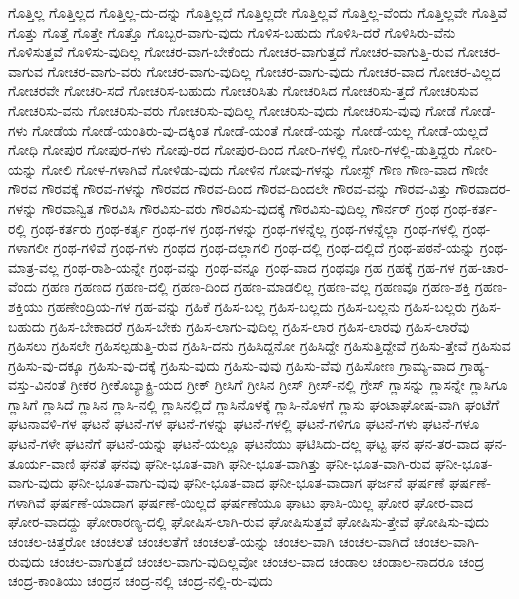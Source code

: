 {ಗೊತ್ತಿಲ್ಲ
ಗೊತ್ತಿಲ್ಲದ
ಗೊತ್ತಿಲ್ಲ-ದು-ದನ್ನು
ಗೊತ್ತಿಲ್ಲದೆ
ಗೊತ್ತಿಲ್ಲದೇ
ಗೊತ್ತಿಲ್ಲವೆ
ಗೊತ್ತಿಲ್ಲ-ವೆಂದು
ಗೊತ್ತಿಲ್ಲವೇ
ಗೊತ್ತಿವೆ
ಗೊತ್ತು
ಗೊತ್ತೆ
ಗೊತ್ತೇ
ಗೊತ್ತೊ
ಗೊಬ್ಬರ-ವಾಗು-ವುದು
ಗೊಳಿಸ-ಬಹುದು
ಗೊಳಿಸಿ-ದರೆ
ಗೊಳಿಸಿರು-ವೆನು
ಗೊಳಿಸುತ್ತವೆ
ಗೊಳಿಸು-ವುದಿಲ್ಲ
ಗೋಚರ-ವಾಗ-ಬೇಕೆಂದು
ಗೋಚರ-ವಾಗುತ್ತದೆ
ಗೋಚರ-ವಾಗುತ್ತಿ-ರುವ
ಗೋಚರ-ವಾಗುವ
ಗೋಚರ-ವಾಗು-ವರು
ಗೋಚರ-ವಾಗು-ವುದಿಲ್ಲ
ಗೋಚರ-ವಾಗು-ವುದು
ಗೋಚರ-ವಾದ
ಗೋಚರ-ವಿಲ್ಲದ
ಗೋಚರವೇ
ಗೋಚರಿ-ಸದೆ
ಗೋಚರಿಸ-ಬಹುದು
ಗೋಚರಿಸಿತು
ಗೋಚರಿಸಿದ
ಗೋಚರಿಸು-ತ್ತದೆ
ಗೋಚರಿಸುವ
ಗೋಚರಿಸು-ವನು
ಗೋಚರಿಸು-ವರು
ಗೋಚರಿಸು-ವುದಿಲ್ಲ
ಗೋಚರಿಸು-ವುದು
ಗೋಚರಿಸು-ವುವು
ಗೋಡೆ
ಗೋಡೆ-ಗಳು
ಗೋಡೆಯ
ಗೋಡೆ-ಯಂತಿರು-ವು-ದಕ್ಕಿಂತ
ಗೋಡೆ-ಯಂತೆ
ಗೋಡೆ-ಯನ್ನು
ಗೋಡೆ-ಯಲ್ಲ
ಗೋಡೆ-ಯಲ್ಲದೆ
ಗೋಧಿ
ಗೋಪುರ
ಗೋಪುರ-ಗಳು
ಗೋಪು-ರದ
ಗೋಪುರ-ದಿಂದ
ಗೋರಿ-ಗಳಲ್ಲಿ
ಗೋರಿ-ಗಳಲ್ಲಿ-ಡುತ್ತಿದ್ದರು
ಗೋರಿ-ಯನ್ನು
ಗೋಲಿ
ಗೋಳ-ಗಳಾಗಿವೆ
ಗೋಳಿಡು-ವುದು
ಗೋಳಿನ
ಗೋವು-ಗಳನ್ನು
ಗೋಸ್ಟ್
ಗೌಣ
ಗೌಣ-ವಾದ
ಗೌಣೀ
ಗೌರವ
ಗೌರವಕ್ಕೆ
ಗೌರವ-ಗಳನ್ನು
ಗೌರವದ
ಗೌರವ-ದಿಂದ
ಗೌರವ-ದಿಂದಲೇ
ಗೌರವ-ವನ್ನು
ಗೌರವ-ವಿತ್ತು
ಗೌರವಾದರ-ಗಳನ್ನು
ಗೌರವಾನ್ವಿತ
ಗೌರವಿಸಿ
ಗೌರವಿಸು-ವರು
ಗೌರವಿಸು-ವುದಕ್ಕೆ
ಗೌರವಿಸು-ವುದಿಲ್ಲ
ಗೌರ್ನರ್
ಗ್ರಂಥ
ಗ್ರಂಥ-ಕರ್ತ-ರಲ್ಲಿ
ಗ್ರಂಥ-ಕರ್ತರು
ಗ್ರಂಥ-ಕರ್ತೃ
ಗ್ರಂಥ-ಗಳ
ಗ್ರಂಥ-ಗಳನ್ನು
ಗ್ರಂಥ-ಗಳನ್ನೆಲ್ಲ
ಗ್ರಂಥ-ಗಳನ್ನೆಲ್ಲಾ
ಗ್ರಂಥ-ಗಳಲ್ಲಿ
ಗ್ರಂಥ-ಗಳಾಗಲೀ
ಗ್ರಂಥ-ಗಳಿವೆ
ಗ್ರಂಥ-ಗಳು
ಗ್ರಂಥದ
ಗ್ರಂಥ-ದಲ್ಲಾಗಲಿ
ಗ್ರಂಥ-ದಲ್ಲಿ
ಗ್ರಂಥ-ದಲ್ಲಿದೆ
ಗ್ರಂಥ-ಪಠನೆ-ಯನ್ನು
ಗ್ರಂಥ-ಮಾತ್ರ-ವಲ್ಲ
ಗ್ರಂಥ-ರಾಶಿ-ಯನ್ನೇ
ಗ್ರಂಥ-ವನ್ನು
ಗ್ರಂಥ-ವನ್ನೂ
ಗ್ರಂಥ-ವಾದ
ಗ್ರಂಥವೂ
ಗ್ರಹ
ಗ್ರಹಕ್ಕೆ
ಗ್ರಹ-ಗಳ
ಗ್ರಹ-ಚಾರ-ವೆಂದು
ಗ್ರಹಣ
ಗ್ರಹಣದ
ಗ್ರಹಣ-ದಲ್ಲಿ
ಗ್ರಹಣ-ದಿಂದ
ಗ್ರಹಣ-ಮಾಡಲಿಲ್ಲ
ಗ್ರಹಣ-ವಲ್ಲ
ಗ್ರಹಣವೂ
ಗ್ರಹಣ-ಶಕ್ತಿ
ಗ್ರಹಣ-ಶಕ್ತಿಯು
ಗ್ರಹಣೇಂದ್ರಿಯ-ಗಳ
ಗ್ರಹ-ವನ್ನು
ಗ್ರಹಿಕೆ
ಗ್ರಹಿಸ-ಬಲ್ಲ
ಗ್ರಹಿಸ-ಬಲ್ಲದು
ಗ್ರಹಿಸ-ಬಲ್ಲನು
ಗ್ರಹಿಸ-ಬಲ್ಲರು
ಗ್ರಹಿಸ-ಬಹುದು
ಗ್ರಹಿಸ-ಬೇಕಾದರೆ
ಗ್ರಹಿಸ-ಬೇಕು
ಗ್ರಹಿಸ-ಲಾಗು-ವುದಿಲ್ಲ
ಗ್ರಹಿಸ-ಲಾರ
ಗ್ರಹಿಸ-ಲಾರವು
ಗ್ರಹಿಸ-ಲಾರೆವು
ಗ್ರಹಿಸಲು
ಗ್ರಹಿಸಲೇ
ಗ್ರಹಿಸಲ್ಪಡುತ್ತಿ-ರುವ
ಗ್ರಹಿಸಿ-ದನು
ಗ್ರಹಿಸಿದ್ದನೋ
ಗ್ರಹಿಸಿದ್ದೇ
ಗ್ರಹಿಸುತ್ತಿದ್ದೇವೆ
ಗ್ರಹಿಸು-ತ್ತೇವೆ
ಗ್ರಹಿಸುವ
ಗ್ರಹಿಸು-ವು-ದಕ್ಕೂ
ಗ್ರಹಿಸು-ವು-ದಕ್ಕೆ
ಗ್ರಹಿಸು-ವುದು
ಗ್ರಹಿಸು-ವುವು
ಗ್ರಹಿಸು-ವೆವು
ಗ್ರಹಿಸೋಣ
ಗ್ರಾಮ್ಯ-ವಾದ
ಗ್ರಾಹ್ಯ-ವಸ್ತು-ವಿನಂತೆ
ಗ್ರೀಕರ
ಗ್ರೀಕೊಬ್ಯಾಕ್ಟ್ರಿ-ಯದ
ಗ್ರೀಕ್
ಗ್ರೀಸಿಗೆ
ಗ್ರೀಸಿನ
ಗ್ರೀಸ್
ಗ್ರೀಸ್-ನಲ್ಲಿ
ಗ್ರೇಸ್
ಗ್ಲಾಸನ್ನು
ಗ್ಲಾಸನ್ನೇ
ಗ್ಲಾಸಿಗೂ
ಗ್ಲಾಸಿಗೆ
ಗ್ಲಾಸಿದೆ
ಗ್ಲಾಸಿನ
ಗ್ಲಾಸಿ-ನಲ್ಲಿ
ಗ್ಲಾಸಿನಲ್ಲಿದೆ
ಗ್ಲಾಸಿನೊಳಕ್ಕೆ
ಗ್ಲಾಸಿ-ನೊಳಗೆ
ಗ್ಲಾಸು
ಘಂಟಾಘೋಷ-ವಾಗಿ
ಘಂಟೆಗೆ
ಘಟನಾವಳಿ-ಗಳ
ಘಟನೆ
ಘಟನೆ-ಗಳ
ಘಟನೆ-ಗಳನ್ನು
ಘಟನೆ-ಗಳಲ್ಲಿ
ಘಟನೆ-ಗಳಿಗೂ
ಘಟನೆ-ಗಳು
ಘಟನೆ-ಗಳೂ
ಘಟನೆ-ಗಳೇ
ಘಟನೆಗೆ
ಘಟನೆ-ಯನ್ನು
ಘಟನೆ-ಯಲ್ಲೂ
ಘಟನೆಯು
ಘಟಿಸಿದು-ದಲ್ಲ
ಘಟ್ಟ
ಘನ
ಘನ-ತರ-ವಾದ
ಘನ-ತೂರ್ಯ-ವಾಣಿ
ಘನತೆ
ಘನವು
ಘನೀ-ಭೂತ-ವಾಗಿ
ಘನೀ-ಭೂತ-ವಾಗಿತ್ತು
ಘನೀ-ಭೂತ-ವಾಗಿ-ರುವ
ಘನೀ-ಭೂತ-ವಾಗು-ವುದು
ಘನೀ-ಭೂತ-ವಾಗು-ವುವು
ಘನೀ-ಭೂತ-ವಾದ
ಘನೀ-ಭೂತ-ವಾದಾಗ
ಘರ್ಜನೆ
ಘರ್ಷಣೆ
ಘರ್ಷಣೆ-ಗಳಾಗಿವೆ
ಘರ್ಷಣೆ-ಯಾದಾಗ
ಘರ್ಷಣೆ-ಯಿಲ್ಲದೆ
ಘರ್ಷಣೆಯೂ
ಘಾಟು
ಘಾಸಿ-ಯಿಲ್ಲ
ಘೋರ
ಘೋರ-ವಾದ
ಘೋರ-ವಾದದ್ದು
ಘೋರಾರಣ್ಯ-ದಲ್ಲಿ
ಘೋಷಿಸ-ಲಾಗಿ-ರುವ
ಘೋಷಿಸುತ್ತವೆ
ಘೋಷಿಸು-ತ್ತೇವೆ
ಘೋಷಿಸು-ವುದು
ಚಂಚಲ-ಚಿತ್ತರೋ
ಚಂಚಲತೆ
ಚಂಚಲತೆಗೆ
ಚಂಚಲತೆ-ಯನ್ನು
ಚಂಚಲ-ವಾಗಿ
ಚಂಚಲ-ವಾಗಿದೆ
ಚಂಚಲ-ವಾಗಿ-ರುವುದು
ಚಂಚಲ-ವಾಗುತ್ತದೆ
ಚಂಚಲ-ವಾಗು-ವುದಿಲ್ಲವೋ
ಚಂಚಲ-ವಾದ
ಚಂಡಾಲ
ಚಂಡಾಲ-ನಾದರೂ
ಚಂದ್ರ
ಚಂದ್ರ-ಕಾಂತಿಯು
ಚಂದ್ರನ
ಚಂದ್ರ-ನಲ್ಲಿ
ಚಂದ್ರ-ನಲ್ಲಿ-ರು-ವುದು
}
